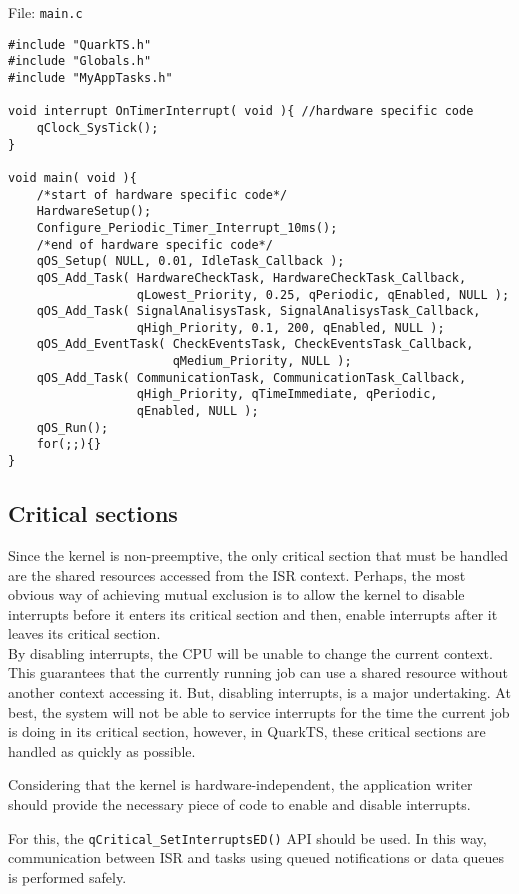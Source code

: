 File: \lstinline{main.c}
\begin{lstlisting}[style=CStyle]
#include "QuarkTS.h"
#include "Globals.h"
#include "MyAppTasks.h"

void interrupt OnTimerInterrupt( void ){ //hardware specific code
    qClock_SysTick();
}

void main( void ){
    /*start of hardware specific code*/
    HardwareSetup();
    Configure_Periodic_Timer_Interrupt_10ms(); 
    /*end of hardware specific code*/
    qOS_Setup( NULL, 0.01, IdleTask_Callback ); 
    qOS_Add_Task( HardwareCheckTask, HardwareCheckTask_Callback,
                  qLowest_Priority, 0.25, qPeriodic, qEnabled, NULL );
    qOS_Add_Task( SignalAnalisysTask, SignalAnalisysTask_Callback, 
                  qHigh_Priority, 0.1, 200, qEnabled, NULL );
    qOS_Add_EventTask( CheckEventsTask, CheckEventsTask_Callback, 
                       qMedium_Priority, NULL ); 
    qOS_Add_Task( CommunicationTask, CommunicationTask_Callback, 
                  qHigh_Priority, qTimeImmediate, qPeriodic, 
                  qEnabled, NULL );
    qOS_Run();
    for(;;){}
}
\end{lstlisting}


\subsection{Critical sections}
Since the kernel is non-preemptive, the only critical section that must be handled are the shared resources accessed from the ISR context. Perhaps, the most obvious way of achieving mutual exclusion is to allow the kernel to disable interrupts before it enters its critical section and then, enable interrupts after it leaves its critical section. \\

By disabling interrupts, the CPU will be unable to change the current context. This guarantees that the currently running job can use a shared resource without another context accessing it. But, disabling interrupts, is a major undertaking. At best, the system will not be able to service interrupts for the time the current job is doing in its critical section, however, in QuarkTS, these critical sections are handled as quickly as possible.  

Considering that the kernel is hardware-independent, the application writer should provide the necessary piece of code to enable and disable interrupts.

For this, the \lstinline{qCritical_SetInterruptsED()}  API should be used. In this way, communication between ISR and tasks using queued notifications or data queues is performed safely. \\

